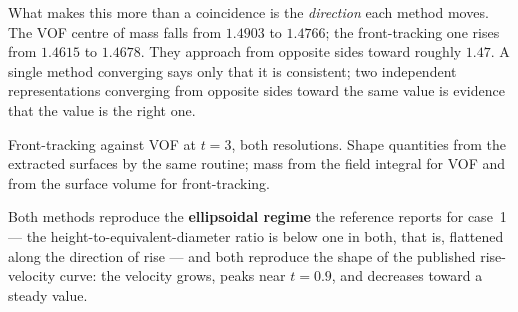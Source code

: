 What makes this more than a coincidence is the \emph{direction} each method
moves. The VOF centre of mass falls from $1.4903$ to $1.4766$; the
front-tracking one rises from $1.4615$ to $1.4678$. They approach from opposite
sides toward roughly $1.47$. A single method converging says only that it is
consistent; two independent representations converging from opposite sides
toward the same value is evidence that the value is the right one.

\begin{table}[htbp]
\centering
\caption{Front-tracking against VOF at $t=3$, both resolutions. Shape
quantities from the extracted surfaces by the same routine; mass from the field
integral for VOF and from the surface volume for front-tracking.}
\label{tab:resolution}
\small
\begin{adjustbox}{max width=\linewidth}
\end{adjustbox}
\end{table}

Both methods reproduce the \textbf{ellipsoidal regime} the reference reports for
case~1 --- the height-to-equivalent-diameter ratio is below one in both, that
is, flattened along the direction of rise --- and both reproduce the shape of
the published rise-velocity curve: the velocity grows, peaks near $t = 0.9$, and
decreases toward a steady value.

